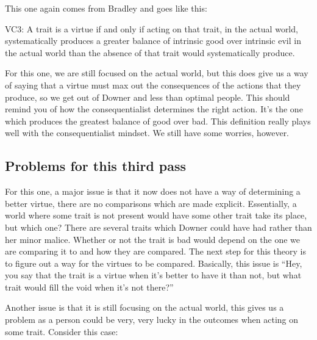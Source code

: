 This one again comes from Bradley and goes like this:
\begin{center}
VC3: A trait is a virtue if and only if acting on that trait, in the actual world, systematically produces a greater balance of intrinsic good over intrinsic evil in the actual world than the absence of that trait would systematically produce.
\end{center}
For this one, we are still focused on the actual world, but this does give us a way of saying that a virtue must max out the consequences of the actions that they produce, so we get out of Downer and less than optimal people. This should remind you of how the consequentialist determines the right action. It's the one which produces the greatest balance of good over bad. This definition really plays well with the consequentialist mindset. We still have some worries, however.

\subsection{Problems for this third pass}

For this one, a major issue is that it now does not have a way of determining a better virtue, there are no comparisons which are made explicit. Essentially, a world where some trait is not present would have some other trait take its place, but which one? There are several traits which Downer could have had rather than her minor malice. Whether or not the trait is bad would depend on the one we are comparing it to and how they are compared.  The next step for this theory is to figure out a way for the virtues to be compared. Basically, this issue is “Hey, you say that the trait is a virtue when it’s better to have it than not, but what trait would fill the void when it’s not there?”

Another issue is that it is still focusing on the actual world, this gives us a problem as a person could be very, very lucky in the outcomes when acting on some trait. Consider this case:



